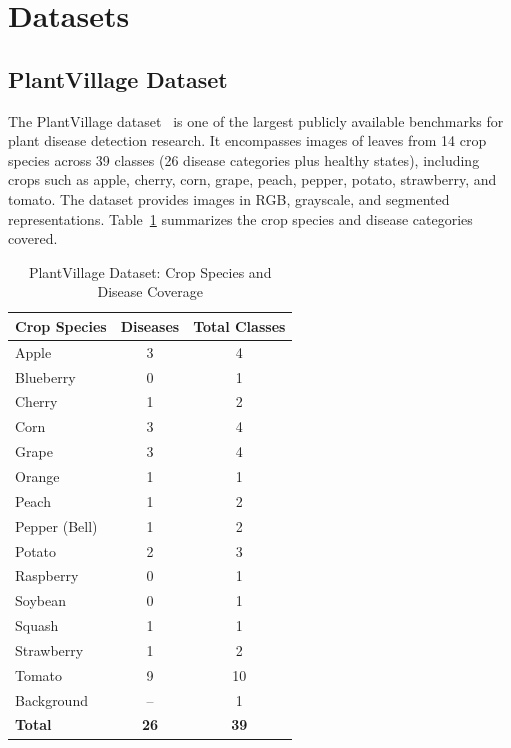 \documentclass[conference]{IEEEtran}
\begin{document}
\section{Datasets}

\subsection{PlantVillage Dataset}
The PlantVillage dataset~\cite{plantvillage_github, plantvillage_kaggle} is one of the largest publicly available benchmarks for plant disease detection research. It encompasses images of leaves from 14 crop species across 39 classes (26 disease categories plus healthy states), including crops such as apple, cherry, corn, grape, peach, pepper, potato, strawberry, and tomato. The dataset provides images in RGB, grayscale, and segmented representations. Table~\ref{tab:plantvillage_classes} summarizes the crop species and disease categories covered.

\begin{table}[htbp]
\caption{PlantVillage Dataset: Crop Species and Disease Coverage}
\label{tab:plantvillage_classes}
\centering
\renewcommand{\arraystretch}{1.1}
\begin{tabular}{@{}lcc@{}}
\toprule
\textbf{Crop Species} & \textbf{Diseases} & \textbf{Total Classes} \\
\midrule
Apple         & 3 & 4 \\
Blueberry     & 0 & 1 \\
Cherry        & 1 & 2 \\
Corn          & 3 & 4 \\
Grape         & 3 & 4 \\
Orange        & 1 & 1 \\
Peach         & 1 & 2 \\
Pepper (Bell) & 1 & 2 \\
Potato        & 2 & 3 \\
Raspberry     & 0 & 1 \\
Soybean       & 0 & 1 \\
Squash        & 1 & 1 \\
Strawberry    & 1 & 2 \\
Tomato        & 9 & 10 \\
Background    & -- & 1 \\
\midrule
\textbf{Total} & \textbf{26} & \textbf{39} \\
\bottomrule
\end{tabular}
\end{table}
\end{document}
